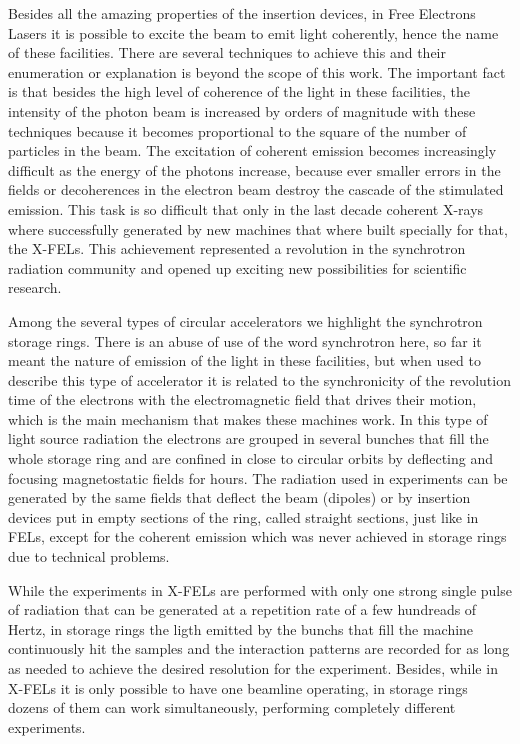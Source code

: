 \documentclass[
	12pt,				%
	openright,			%
	oneside,			%
	a4paper,		%
	chapter=TITLE,		%
	section=TITLE,		%
    brazil,				%
	english,			%
	sumario=tradicional,
	]{abntex2}
\begin{document}
    Besides all the amazing properties of the insertion devices, in Free Electrons Lasers it is possible to excite the beam to emit light coherently, hence the name of these facilities. There are several techniques to achieve this and their enumeration or explanation is beyond the scope of this work. The important fact is that besides the high level of coherence of the light in these facilities, the intensity of the photon beam is increased by orders of magnitude with these techniques because it becomes proportional to the square of the number of particles in the beam. The excitation of coherent emission becomes increasingly difficult as the energy of the photons increase, because ever smaller errors in the fields or decoherences in the electron beam destroy the cascade of the stimulated emission. This task is so difficult that only in the last decade coherent X-rays where successfully generated by new machines that where built specially for that, the X-FELs. This achievement represented a revolution in the synchrotron radiation community and opened up exciting new possibilities for scientific research.

    Among the several types of circular accelerators we highlight the synchrotron storage rings. There is an abuse of use of the word synchrotron here, so far it meant the nature of emission of the light in these facilities, but when used to describe this type of accelerator it is related to the synchronicity of the revolution time of the electrons with the electromagnetic field that drives their motion, which is the main mechanism that makes these machines work. In this type of light source radiation the electrons are grouped in several bunches that fill the whole storage ring and are confined in close to circular orbits by deflecting and focusing magnetostatic fields for hours. The radiation used in experiments can be generated by the same fields that deflect the beam (dipoles) or by insertion devices put in empty sections of the ring, called straight sections, just like in FELs, except for the coherent emission which was never achieved in storage rings due to technical problems.

    While the experiments in X-FELs are performed with only one strong single pulse of radiation that can be generated at a repetition rate of a few hundreads of Hertz, in storage rings the ligth emitted by the bunchs that fill the machine continuously hit the samples and the interaction patterns are recorded for as long as needed to achieve the desired resolution for the experiment. Besides, while in X-FELs it is only possible to have one beamline operating, in storage rings dozens of them can work simultaneously, performing completely different experiments.
\end{document}
